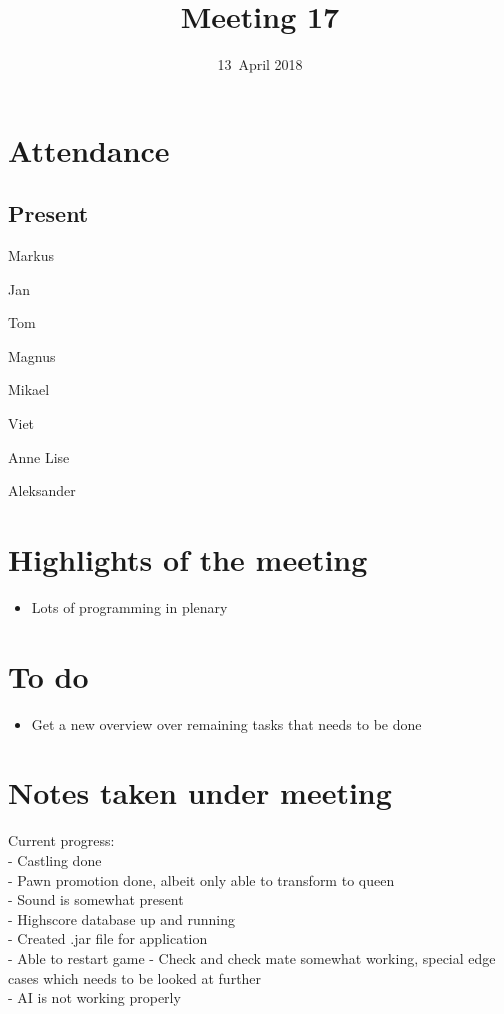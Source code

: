 \documentclass[letterpaper,11pt]{article}
\title{Meeting 17}
\date{13~April 2018}
\begin{document}
\maketitle
\section*{Attendance}
\subsection*{Present}
\begin{list}{}{}
	\item Markus
	\item Jan
	\item Tom
	\item Magnus
	\item Mikael
	\item Viet
	\item Anne Lise
	\item Aleksander
\end{list}

\newpage
\section*{Highlights of the meeting}
\begin{itemize}
	\item Lots of programming in plenary
\end{itemize}

\section*{To do}
\begin{itemize}
	\item Get a new overview over remaining tasks that needs to be done
\end{itemize}

\section*{Notes taken under meeting}
Current progress:\\
- Castling done\\
- Pawn promotion done, albeit only able to transform to queen\\
- Sound is somewhat present\\
- Highscore database up and running\\
- Created .jar file for application\\
- Able to restart game
- Check and check mate somewhat working, special edge cases which needs to be looked at further\\
- AI is not working properly\\
\end{document}

